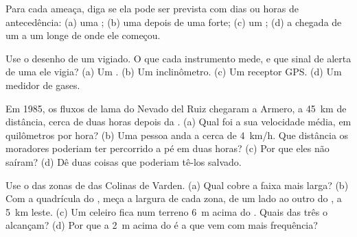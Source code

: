 \begin{exercise}[$\star$]\label{exo:g9:natural-risks:3}
Para cada ameaça, diga se ela pode ser prevista com dias ou horas de
antecedência: (a) uma ; (b) uma  depois de uma 
forte; (c) um ; (d) a chegada de um  a um  longe
de onde ele começou.
\end{exercise}

\begin{exercise}[$\star$]\label{exo:g9:natural-risks:4}
Use o desenho de um  vigiado. O que cada instrumento mede, e que
sinal de alerta de uma  ele vigia? (a) Um . (b) Um
inclinômetro. (c) Um receptor GPS. (d) Um medidor de gases.
\end{exercise}

\begin{exercise}[$\star\star$]\label{exo:g9:natural-risks:5}
Em 1985, os fluxos de lama do Nevado del Ruiz chegaram a Armero, a
\qty{45}{km} de distância, cerca de duas horas depois da . (a)
Qual foi a sua velocidade média, em quilômetros por hora? (b) Uma pessoa
anda a cerca de \qty{4}{km/h}. Que distância os moradores poderiam ter
percorrido a pé em duas horas? (c) Por que eles não saíram? (d) Dê duas
coisas que poderiam tê-los salvado.
\end{exercise}

\begin{exercise}[$\star\star$]\label{exo:g9:natural-risks:6}
Use o  das zonas de  das Colinas de Varden. (a) Qual
 cobre a faixa mais larga? (b) Com a quadrícula do , meça a
largura de cada zona, de um lado ao outro do , a \qty{5}{km} leste.
(c) Um celeiro fica num terreno \qty{6}{m} acima do .
Quais das três  o alcançam? (d) Por que a  \qty{2}{m}
acima do  é a que vem com mais frequência?
\end{exercise}

